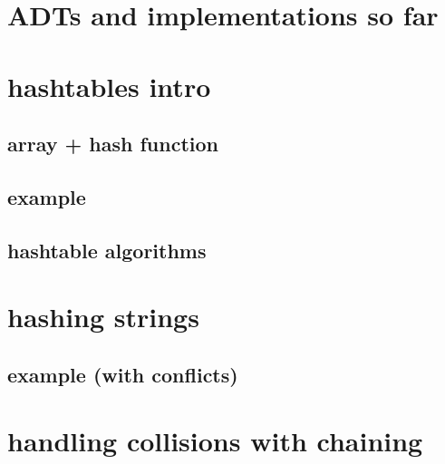 
\begin{frame}
    \titlepage
\end{frame}

\section{ADTs and implementations so far}



\section{hashtables intro}

\subsection{array + hash function}







\subsection{example}


\subsection{hashtable algorithms}


\section{hashing strings}





\subsection{example (with conflicts)}


\section{handling collisions with chaining}


